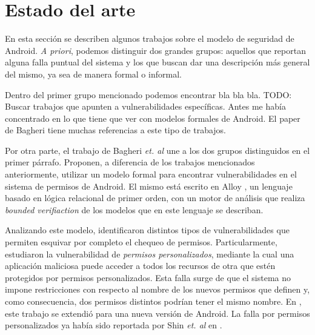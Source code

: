 
\chapter*{Estado del arte}
\label{chapter:estado}

En esta sección se describen algunos trabajos sobre el modelo de seguridad de
Android. \textit{A priori}, podemos distinguir dos grandes grupos: aquellos que
reportan alguna falla puntual del sistema y los que buscan dar una descripción
más general del mismo, ya sea de manera formal o informal.

Dentro del primer grupo mencionado podemos encontrar bla bla bla. TODO: Buscar
trabajos que apunten a vulnerabilidades específicas. Antes me había concentrado
en lo que tiene que ver con modelos formales de Android. El paper de Bagheri
\cite{bagheri} tiene muchas referencias a este tipo de trabajos.

Por otra parte, el trabajo de Bagheri \textit{et. al} \cite{bagheri15} une a los
dos grupos distinguidos en el primer párrafo. Proponen, a diferencia de los trabajos
mencionados anteriormente, utilizar un modelo formal para encontrar
vulnerabilidades en el sistema de permisos de Android. El mismo está escrito en
Alloy \cite{alloy}, un lenguaje basado en lógica relacional de primer orden, con
un motor de análisis que realiza \textit{bounded verifiaction} de los
%
%
modelos que en este lenguaje se describan.

Analizando este modelo, identificaron distintos tipos de vulnerabilidades que
permiten esquivar por completo el chequeo de permisos. Particularmente,
estudiaron la vulnerabilidad
%
%
de \textit{permisos personalizados}, mediante la cual una aplicación maliciosa
puede acceder a todos los recursos de otra que estén protegidos por permisos
personalizados. Esta falla surge de que el sistema no impone restricciones con
respecto al nombre de los nuevos permisos que definen y, como consecuencia, dos
permisos distintos podrían tener el mismo nombre. En \cite{bagheri}, este trabajo
se extendió para una nueva versión de Android. La falla por permisos personalizados
ya había sido reportada por Shin \textit{et. al} en \cite{shin-custom}.


